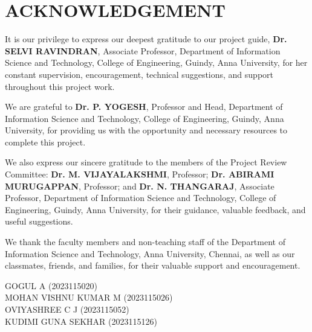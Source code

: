 \chapter*{\uppercase{ACKNOWLEDGEMENT}}

\vspace{0.35cm}
\begingroup
\fontsize{12}{15.5}\selectfont
\setlength{\parindent}{1.5em}
\setlength{\parskip}{0.65em}
\setlength{\leftskip}{0.07\textwidth}
\setlength{\rightskip}{0.07\textwidth}

It is our privilege to express our deepest gratitude to our project guide, \textbf{Dr. SELVI RAVINDRAN}, Associate Professor, Department of Information Science and Technology, College of Engineering, Guindy, Anna University, for her constant supervision, encouragement, technical suggestions, and support throughout this project work.

We are grateful to \textbf{Dr. P. YOGESH}, Professor and Head, Department of Information Science and Technology, College of Engineering, Guindy, Anna University, for providing us with the opportunity and necessary resources to complete this project.

We also express our sincere gratitude to the members of the Project Review Committee: \textbf{Dr. M. VIJAYALAKSHMI}, Professor; \textbf{Dr. ABIRAMI MURUGAPPAN}, Professor; and \textbf{Dr. N. THANGARAJ}, Associate Professor, Department of Information Science and Technology, College of Engineering, Guindy, Anna University, for their guidance, valuable feedback, and useful suggestions.

We thank the faculty members and non-teaching staff of the Department of Information Science and Technology, Anna University, Chennai, as well as our classmates, friends, and families, for their valuable support and encouragement.

\begin{flushright}
\setlength{\parskip}{0pt}
\setlength{\rightskip}{0.07\textwidth}
GOGUL A (2023115020)\\
MOHAN VISHNU KUMAR M (2023115026)\\
OVIYASHREE C J (2023115052)\\
KUDIMI GUNA SEKHAR (2023115126)
\end{flushright}
\endgroup
